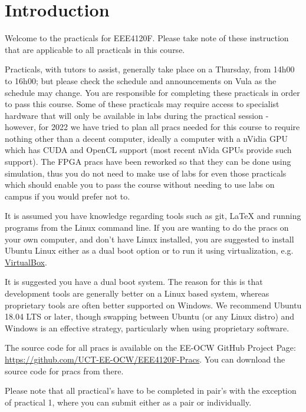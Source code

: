 \section*{Introduction}
Welcome to the practicals for EEE4120F. Please take note of these instruction that are applicable to all practicals in this course.

Practicals, with tutors to assist, generally take place on a Thursday, from 14h00 to 16h00; but please check the schedule and announcements on Vula as the schedule may change. You are responsible for completing these practicals in order to pass this course. Some of these practicals may require access to specialist hardware that will only be available in labs during the practical session - however, for 2022 we have tried to plan all pracs needed for this course to require nothing other than a decent computer, ideally a computer with a nVidia GPU which has CUDA and OpenCL support (most recent nVida GPUs provide such support). The FPGA pracs have been reworked so that they can be done using simulation, thus you do not need to make use of labs for even those practicals which should enable you to pass the course without needing to use labs on campus if you would prefer not to.

It is assumed you have knowledge regarding tools such as git, \LaTeX{} and running programs from the Linux command line. If you are wanting to do the pracs on your own computer, and don't have Linux installed, you are suggested to install Ubuntu Linux either as a dual boot option or to run it using virtualization, e.g. \href{https://www.virtualbox.org/}{VirtualBox}.

It is suggested you have a dual boot system. The reason for this is that development tools are generally better on a Linux based system, whereas proprietary tools are often better supported on Windows. We recommend Ubuntu 18.04 LTS or later, though swapping between Ubuntu (or any Linux distro) and Windows is an effective strategy, particularly when using proprietary software.

The source code for all pracs is available on the EE-OCW GitHub Project Page: \href{https://github.com/UCT-EE-OCW/EEE4120F-Pracs}{https://github.com/UCT-EE-OCW/EEE4120F-Pracs}. You can download the source code for pracs from there.

Please note that all practical's have to be completed in pair's with the exception of practical 1, where you can submit either as a pair or individually.